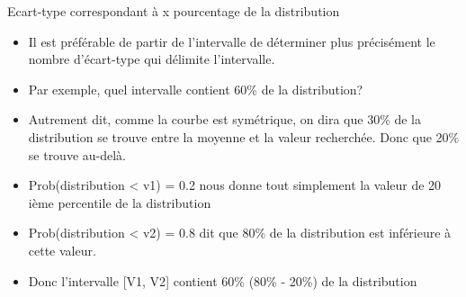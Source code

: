 \documentclass[ignorenonframetext,]{beamer}
\providecommand{\tightlist}{%
  \setlength{\itemsep}{0pt}\setlength{\parskip}{0pt}}
\begin{document}
\begin{frame}{Ecart-type correspondant à x pourcentage de la
distribution}

\begin{itemize}
\tightlist
\item
  Il est préférable de partir de l'intervalle de déterminer plus
  précisément le nombre d'écart-type qui délimite l'intervalle.
\end{itemize}

\begin{itemize}[<+->]
\tightlist
\item
  Par exemple, quel intervalle contient 60\% de la distribution?
\end{itemize}

\begin{itemize}[<+->]
\tightlist
\item
  Autrement dit, comme la courbe est symétrique, on dira que 30\% de la
  distribution se trouve entre la moyenne et la valeur recherchée. Donc
  que 20\% se trouve au-delà.
\end{itemize}

\begin{itemize}[<+->]
\tightlist
\item
  Prob(distribution \textless{} v1) = 0.2 nous donne tout simplement la
  valeur de 20 ième percentile de la distribution
\end{itemize}

\begin{itemize}[<+->]
\tightlist
\item
  Prob(distribution \textless{} v2) = 0.8 dit que 80\% de la
  distribution est inférieure à cette valeur.
\end{itemize}

\begin{itemize}[<+->]
\tightlist
\item
  Donc l'intervalle {[}V1, V2{]} contient 60\% (80\% - 20\%) de la
  distribution
\end{itemize}

\end{frame}
\end{document}
